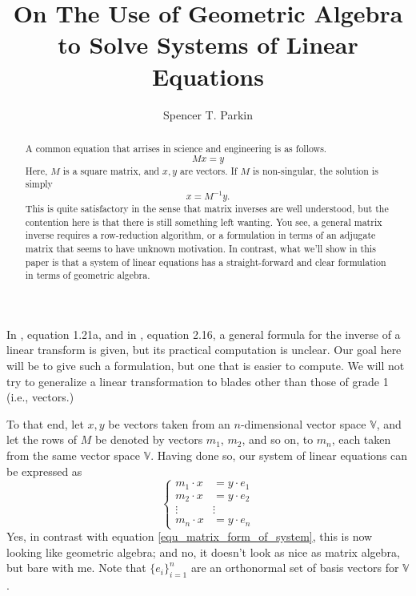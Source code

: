 \documentclass{birkjour}
\title{On The Use of Geometric Algebra\\to Solve Systems of Linear Equations}
\author{Spencer T. Parkin}
\newcommand{\V}{\mathbb{V}}
\begin{document}
\begin{abstract}
A common equation that arrises in science and engineering is as follows.
\begin{equation}\label{equ_matrix_form_of_system}
Mx=y
\end{equation}
Here, $M$ is a square matrix, and $x,y$ are vectors.  If $M$ is non-singular, the solution is simply
\begin{equation}\label{equ_matrix_algebra_solved}
x=M^{-1}y.
\end{equation}
This is quite satisfactory in the sense that matrix inverses are well understood, but the contention here is that
there is still something left wanting.  You see, a general matrix inverse requires a row-reduction algorithm, or
a formulation in terms of an adjugate matrix that seems to have unknown motivation.  In contrast, what we'll show in this paper is that a
system of linear equations has a straight-forward and clear formulation in terms of geometric algebra.
\end{abstract}

\maketitle


In \cite{Hestenes84}, equation 1.21a, and in \cite{Hestenes91}, equation 2.16, a general formula for the inverse of a linear transform is given,
but its practical computation is unclear.  Our goal here will be to give such a formulation, but one that
is easier to compute.  We will not try to generalize a linear transformation to blades other than those of grade 1 (i.e., vectors.)

To that end, let $x,y$ be vectors taken from an $n$-dimensional vector space $\V$, and let the rows of $M$
be denoted by vectors $m_1$, $m_2$, and so on, to $m_n$, each taken from the same vector space $\V$.
Having done so, our system of linear equations can be expressed as
\begin{equation}\label{equ_linear_system}
\left\{
\begin{array}{cc}
m_1\cdot x &= y\cdot e_1 \\
m_2\cdot x &= y\cdot e_2 \\
\vdots & \vdots \\
m_n\cdot x &= y\cdot e_n
\end{array}
\right.
\end{equation}
Yes, in contrast with equation \eqref{equ_matrix_form_of_system}, this is now looking like geometric algebra; and no, it doesn't look as nice as matrix algebra,
but bare with me.  Note that $\{e_i\}_{i=1}^n$ are an orthonormal set of basis vectors for $\V$.
\end{document}
